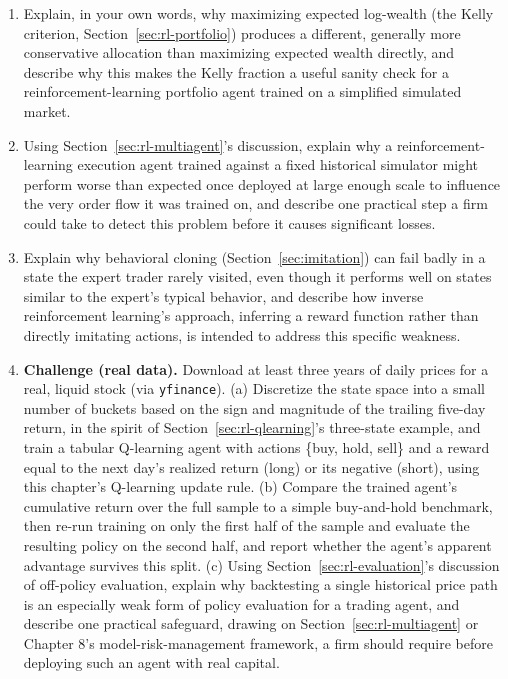 \documentclass[../ai_in_finance]{subfiles}
\begin{document}
\begin{enumerate}
    \item Explain, in your own words, why maximizing expected log-wealth (the Kelly criterion, Section~\ref{sec:rl-portfolio}) produces a different, generally more conservative allocation than maximizing expected wealth directly, and describe why this makes the Kelly fraction a useful sanity check for a reinforcement-learning portfolio agent trained on a simplified simulated market.
    \item Using Section~\ref{sec:rl-multiagent}'s discussion, explain why a reinforcement-learning execution agent trained against a fixed historical simulator might perform worse than expected once deployed at large enough scale to influence the very order flow it was trained on, and describe one practical step a firm could take to detect this problem before it causes significant losses.
    \item Explain why behavioral cloning (Section~\ref{sec:imitation}) can fail badly in a state the expert trader rarely visited, even though it performs well on states similar to the expert's typical behavior, and describe how inverse reinforcement learning's approach, inferring a reward function rather than directly imitating actions, is intended to address this specific weakness.
    \item \textbf{Challenge (real data).} Download at least three years of daily prices for a real, liquid stock (via \texttt{yfinance}). (a) Discretize the state space into a small number of buckets based on the sign and magnitude of the trailing five-day return, in the spirit of Section~\ref{sec:rl-qlearning}'s three-state example, and train a tabular Q-learning agent with actions \{buy, hold, sell\} and a reward equal to the next day's realized return (long) or its negative (short), using this chapter's Q-learning update rule. (b) Compare the trained agent's cumulative return over the full sample to a simple buy-and-hold benchmark, then re-run training on only the first half of the sample and evaluate the resulting policy on the second half, and report whether the agent's apparent advantage survives this split. (c) Using Section~\ref{sec:rl-evaluation}'s discussion of off-policy evaluation, explain why backtesting a single historical price path is an especially weak form of policy evaluation for a trading agent, and describe one practical safeguard, drawing on Section~\ref{sec:rl-multiagent} or Chapter 8's model-risk-management framework, a firm should require before deploying such an agent with real capital.
\end{enumerate}
\end{document}
